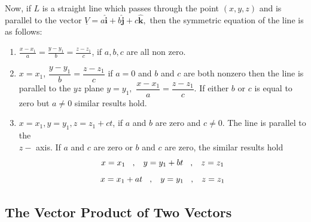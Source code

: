 \documentclass[11pt,a4paper]{article}
\theoremstyle{definition}
\begin{document}
Now, if $L$ is a straight line which passes through the point $(x,y,z)$ and is parallel to the vector $\underline{V} = a \hat{\textbf{i}} + b\hat{\textbf{j}} + c\hat{\textbf{k}},$ then the symmetric equation of the line is as follows:
\begin{enumerate}
\item $\displaystyle{\frac{x- x_1}{a} = \frac{y - y_1}{b} = \frac{z - z_1}{c}}$, if $a, b, c$ are all non zero.
\item $x =x_1$, $\dfrac{y - y_1}{b} = \dfrac{z - z_1}{c}$ if $a = 0$ and $b$ and $c$ are both nonzero then the line is parallel to the $yz$ plane $y = y_1,$ $\dfrac{x - x_1}{a} = \dfrac{z - z_1}{c}$.
If either $b$ or $c$ is equal to zero but $a\neq 0$ similar results hold.
\item $x =x_1, y = y_1 , z = z_1 + ct$, if $a$ and $b$ are zero and $c\neq 0$. The line is parallel to the\\ $z-$ axis. If $a$ and $c$ are zero or $b$ and $c$ are zero, the similar results hold
$$x = x_1\hspace{0.3cm} , \hspace{0.3cm} y = y_1 +bt\hspace{0.3cm} ,\hspace{0.3cm} z =z_1$$
$$x = x_1 + at\hspace{0.3cm} , \hspace{0.3cm} y = y_1\hspace{0.3cm} , \hspace{0.3cm} z = z_1$$
\end{enumerate}

\subsection{The Vector Product of Two Vectors}
\end{document}
